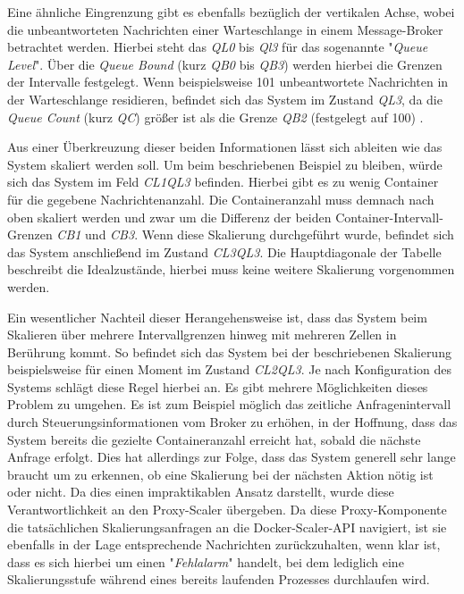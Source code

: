 Eine ähnliche Eingrenzung gibt es ebenfalls bezüglich der vertikalen Achse, wobei die unbeantworteten Nachrichten einer Warteschlange in einem Message-Broker betrachtet werden. Hierbei steht das \emph{QL0} bis \emph{Ql3} für das sogenannte "\emph{Queue Level}". Über die \emph{Queue Bound} (kurz \emph{QB0} bis \emph{QB3}) werden hierbei die Grenzen der Intervalle festgelegt. Wenn beispielsweise 101 unbeantwortete Nachrichten in der Warteschlange residieren, befindet sich das System im Zustand \emph{QL3}, da die \emph{Queue Count} (kurz \emph{QC}) größer ist als die Grenze \emph{QB2} (festgelegt auf 100) .

Aus einer Überkreuzung dieser beiden Informationen lässt sich ableiten wie das System skaliert werden soll. Um beim beschriebenen Beispiel zu bleiben, würde sich das System im Feld \emph{CL1QL3} befinden. Hierbei gibt es zu wenig Container für die gegebene Nachrichtenanzahl. Die Containeranzahl muss demnach nach oben skaliert werden und zwar um die Differenz der beiden Container-Intervall-Grenzen \emph{CB1} und \emph{CB3}. Wenn diese Skalierung durchgeführt wurde, befindet sich das System anschließend im Zustand \emph{CL3QL3}. Die Hauptdiagonale der Tabelle beschreibt die Idealzustände, hierbei muss keine weitere Skalierung vorgenommen werden. 

\label{prometheus:skalierungsmechanismus}
Ein wesentlicher Nachteil dieser Herangehensweise ist, dass das System beim Skalieren über mehrere Intervallgrenzen hinweg mit mehreren Zellen in Berührung kommt. So befindet sich das System bei der beschriebenen Skalierung beispielsweise für einen Moment im Zustand \emph{CL2QL3}. Je nach Konfiguration des Systems schlägt diese Regel hierbei an. Es gibt mehrere Möglichkeiten dieses Problem zu umgehen. Es ist zum Beispiel möglich das zeitliche Anfragenintervall durch Steuerungsinformationen vom Broker zu erhöhen, in der Hoffnung, dass das System bereits die gezielte Containeranzahl erreicht hat, sobald die nächste Anfrage erfolgt. Dies hat allerdings zur Folge, dass das System generell sehr lange braucht um zu erkennen, ob eine Skalierung bei der nächsten Aktion nötig ist oder nicht. Da dies einen impraktikablen Ansatz darstellt, wurde diese Verantwortlichkeit an den Proxy-Scaler übergeben. Da diese Proxy-Komponente die tatsächlichen Skalierungsanfragen an die Docker-Scaler-API navigiert, ist sie ebenfalls in der Lage entsprechende Nachrichten zurückzuhalten, wenn klar ist, dass es sich hierbei um einen "\emph{Fehlalarm}" handelt, bei dem lediglich eine Skalierungsstufe während eines bereits laufenden Prozesses durchlaufen wird. 

